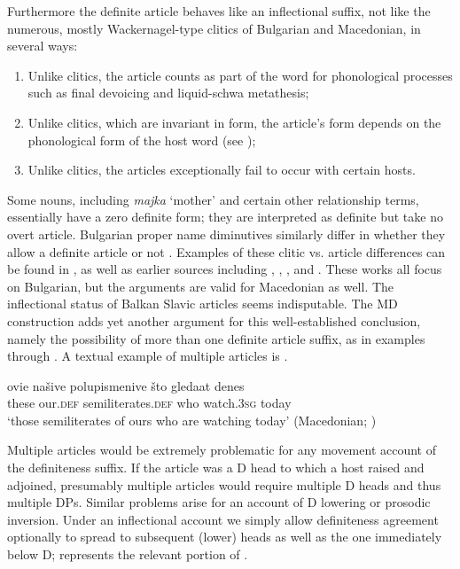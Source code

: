 \documentclass[output=paper,
colorlinks,
citecolor=brown,
newtxmath
]{langscibook}
\begin{document}
\noindent Furthermore the definite article behaves like an inflectional suffix, not like the numerous, mostly Wackernagel-type clitics of Bulgarian and Macedonian, in several ways:
\begin{enumerate}
    \item Unlike clitics, the article counts as part of the word for phonological processes such as final devoicing and liquid-schwa metathesis;
    \item Unlike clitics, which are invariant in form, the article's form depends on the phonological form of the host word (see );
    \item Unlike clitics, the articles exceptionally fail to occur with certain hosts.
\end{enumerate}
Some nouns, including \textit{majka} `mother' and certain other relationship terms, essentially have a zero definite form; they are interpreted as definite but take no overt article. Bulgarian proper name diminutives similarly differ in whether they allow a definite article or not \citep{Nicolova2017}. Examples of these clitic vs. article differences can be found in \cite{RudinToAppear}, as well as earlier sources including \cite{Elson1976}, \cite{Halpern1995}, \cite{Franks2001}, and \cite{Koev2011}. These works all focus on Bulgarian, but the arguments are valid for Macedonian as well. The inflectional status of Balkan Slavic articles seems indisputable. The MD construction adds yet another argument for this well-established conclusion, namely the possibility of more than one definite article suffix, as in examples  through . A textual example of multiple articles is .

\ea \label{watching}
\gll ovie 	našive polupismenive	što gledaat denes \\
these our.\textsc{def} semiliterates.\textsc{def} 	who watch.\textsc{3sg} today \\
\glt‘those semiliterates of ours who are watching today’
\glt \hfill(Macedonian; \citealt{Prizma2015})
\z


\noindent Multiple articles would be extremely problematic for any movement account of the definiteness suffix. If the article was a D head to which a host raised and adjoined, presumably multiple articles would require multiple D heads and thus multiple DPs. Similar problems arise for an account of D lowering or prosodic inversion. Under an inflectional account we simply allow definiteness agreement optionally to spread to subsequent (lower) heads as well as the one immediately below D;  represents the relevant portion of .
\end{document}
